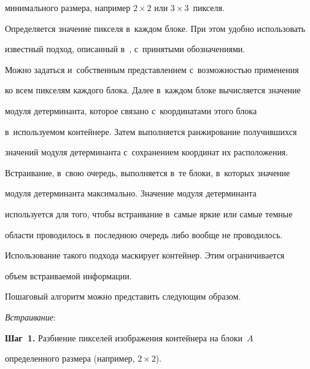 минимального размера, например $2\times2$ или $3\times3$~пикселя. 


Определяется значение пикселя в~каждом блоке. При этом удобно использовать 


известный подход, описанный в~\cite{10-lin}, с~принятыми обозначениями. 


Можно задаться и~собственным представлением с~возможностью применения 


ко всем пикселям каждого блока. Далее в~каждом блоке вычисляется значение 


модуля детерминанта, которое связано с~координатами этого блока 


в~используемом контейнере. Затем выполняется ранжирование получившихся 


значений модуля детерминанта с~сохранением координат их расположения.


  


  Встраивание, в~свою очередь, выполняется в~те блоки, в~которых значение 


модуля детерминанта максимально. Значение модуля детерминанта 


используется для того, чтобы встраивание в~самые яркие или самые темные 


области проводилось в~последнюю очередь либо вообще не проводилось. 


Использование такого подхода маскирует контейнер. Этим ограничивается 


объем встраиваемой информации.


  


  Пошаговый алгоритм можно представить следующим образом.


  


  \smallskip


  


  \textit{Встраивание}:


  


  \smallskip


  


 \textbf{Шаг~1.} Разбиение пикселей изображения контейнера на блоки~$A$ 


определенного размера (например, $2\times2$). 


  



